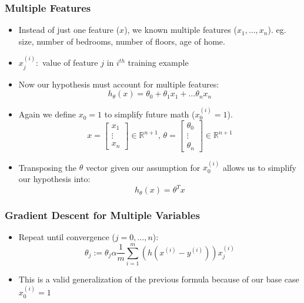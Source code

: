\subsubsection{Multiple Features}
\begin{itemize}[--]
	\item Instead of just one feature ($x$), we known multiple features ($x_1,\ldots, x_n$). eg. size, number of bedrooms, number of floors, age of home.
	\item $x^{(i)}_j:$ value of feature $j$ in $i^{th}$ training example
	\item Now our hypothesis must account for multiple features: 
		$$h_\theta (x)=\theta_0 + \theta_1 x_1 + \ldots \theta_n x_n$$
	\item Again we define $x_0 = 1$ to simplify future math ($x^{(i)}_0=1$).
	$$x=\begin{bmatrix} x_1\\ \vdots\\ x_n\end{bmatrix}\in \mathbb{R}^{n+1}\text{,  }
		\theta = \begin{bmatrix}\theta_0 \\ \vdots\\ \theta_n\end{bmatrix}\in\mathbb{R}^{n+1}$$
	\item Transposing the $\theta$ vector given our assumption for $x_0^{(i)}$ allows us to simplify our hypothesis into:
		$$h_\theta (x) = \theta^{T}x$$
\end{itemize}

\subsubsection{Gradient Descent for Multiple Variables}
\begin{itemize}[--]
	\item Repeat until convergence ($j=0,\ldots, n$): 
		$$\theta_j := \theta_j \alpha\frac{1}{m}\sum_{i=1}^{m}(h(x^{(i)}-y^{(i)}))x^{(i)}_j$$
	\item This is a valid generalization of the previous formula because of our base case $x^{(i)}_0=1$
\end{itemize}

